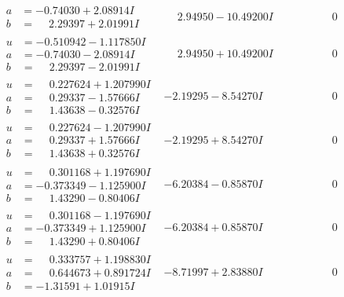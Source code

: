 \documentclass[1p]{elsarticle_modified}
\theoremstyle{definition}
\begin{document}
$$\begin{array}{c|c|c}
\begin{aligned}
a &= -0.74030 + 2.08914 I \\
b &= \phantom{-}2.29397 + 2.01991 I\end{aligned}
 & \phantom{-}2.94950 - 10.49200 I & \phantom{-0.000000 } 0 \\ \hline\begin{aligned}
u &= -0.510942 - 1.117850 I \\
a &= -0.74030 - 2.08914 I \\
b &= \phantom{-}2.29397 - 2.01991 I\end{aligned}
 & \phantom{-}2.94950 + 10.49200 I & \phantom{-0.000000 } 0 \\ \hline\begin{aligned}
u &= \phantom{-}0.227624 + 1.207990 I \\
a &= \phantom{-}0.29337 - 1.57666 I \\
b &= \phantom{-}1.43638 - 0.32576 I\end{aligned}
 & -2.19295 - 8.54270 I & \phantom{-0.000000 } 0 \\ \hline\begin{aligned}
u &= \phantom{-}0.227624 - 1.207990 I \\
a &= \phantom{-}0.29337 + 1.57666 I \\
b &= \phantom{-}1.43638 + 0.32576 I\end{aligned}
 & -2.19295 + 8.54270 I & \phantom{-0.000000 } 0 \\ \hline\begin{aligned}
u &= \phantom{-}0.301168 + 1.197690 I \\
a &= -0.373349 - 1.125900 I \\
b &= \phantom{-}1.43290 - 0.80406 I\end{aligned}
 & -6.20384 - 0.85870 I & \phantom{-0.000000 } 0 \\ \hline\begin{aligned}
u &= \phantom{-}0.301168 - 1.197690 I \\
a &= -0.373349 + 1.125900 I \\
b &= \phantom{-}1.43290 + 0.80406 I\end{aligned}
 & -6.20384 + 0.85870 I & \phantom{-0.000000 } 0 \\ \hline\begin{aligned}
u &= \phantom{-}0.333757 + 1.198830 I \\
a &= \phantom{-}0.644673 + 0.891724 I \\
b &= -1.31591 + 1.01915 I\end{aligned}
 & -8.71997 + 2.83880 I & \phantom{-0.000000 } 0 \\ \hline\begin{aligned}

\end{aligned}
\end{array}$$
\end{document}
